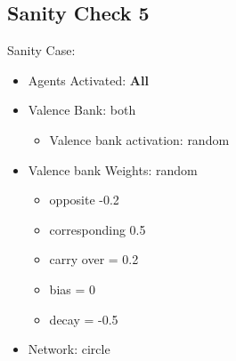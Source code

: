 \documentclass{article}\usepackage[]{graphicx}\usepackage[]{color}
\begin{document}
\subsection{Sanity Check 5}
\label{sec:sanity5}
Sanity Case:
\begin{itemize}
  \item Agents Activated: \textbf{All}
  \item Valence Bank: both
  \begin{itemize}
      \item Valence bank activation: random
  \end{itemize}
  \item Valence bank Weights: random
  \begin{itemize}
      \item opposite -0.2
      \item corresponding 0.5
      \item carry over = 0.2
      \item bias = 0
      \item decay = -0.5
  \end{itemize}
  \item Network: circle
\end{itemize}
\end{document}

